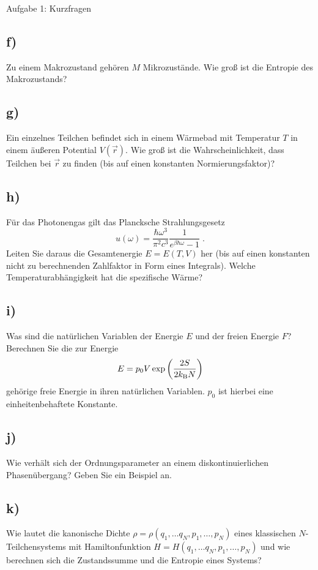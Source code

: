 \begin{aufgabe}{Aufgabe 1: Kurzfragen}
    \subsection{f)}
    Zu einem Makrozustand gehören $M$ Mikrozustände.
    Wie groß ist die Entropie des Makrozustands?

    \subsection{g)}
    Ein einzelnes Teilchen befindet sich in einem Wärmebad mit Temperatur $T$ in einem äußeren Potential $V(\vec r)$. Wie groß ist die Wahrscheinlichkeit, dass Teilchen bei $\vec r$ zu finden (bis auf einen konstanten Normierungsfaktor)?

    \subsection{h)}
    Für das Photonengas gilt das Plancksche Strahlungsgesetz
    \[
    u(\omega) = \frac{\hbar\omega^3}{\pi^2c^3}\frac{1}{e^{\beta\hbar\omega} - 1} \;.
    \]
    Leiten Sie daraus die Gesamtenergie $E = E(T,V)$ her (bis auf einen konstanten nicht zu berechnenden Zahlfaktor in Form eines Integrals).
    Welche Temperaturabhängigkeit hat die spezifische Wärme?

    \subsection{i)}
    Was sind die natürlichen Variablen der Energie $E$ und der freien Energie $F$?
    Berechnen Sie die zur Energie
    \[
        E = p_0 V \exp\left(\frac{2S}{2k_\text{B} N}\right)
    \]
    gehörige freie Energie in ihren natürlichen Variablen.
    $p_0$ ist hierbei eine einheitenbehaftete Konstante.


    \subsection{j)}
    Wie verhält sich der Ordnungsparameter an einem diskontinuierlichen Phasenübergang?
    Geben Sie ein Beispiel an.

    \subsection{k)}
    Wie lautet die kanonische Dichte $\rho = \rho(q_1, \ldots q_N, p_1, \ldots, p_N)$ eines klassischen $N$-Teilchensystems mit Hamiltonfunktion $H = H(q_1, \ldots q_N, p_1, \ldots, p_N)$ und wie berechnen sich die Zustandssumme und die Entropie eines Systems?
\end{aufgabe}

